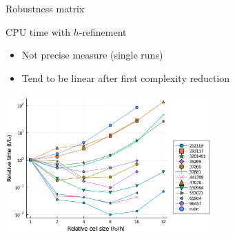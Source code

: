 \documentclass{beamer}
\begin{document}
\begin{frame}{Robustness matrix}

  \begin{block}{CPU time with $h$-refinement}
  \begin{itemize}
    \item
      Not precise measure (single runs)
    \item
      Tend to be linear after first complexity reduction
  \end{itemize}
  \end{block}

  \centering
  \includegraphics[width=0.60\textwidth]{../analysis/plots/x_nmax_y_time}

\end{frame}
\end{document}
